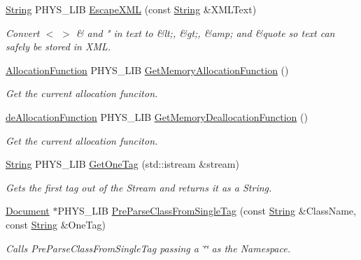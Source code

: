 \begin{DoxyCompactItemize}
\hyperlink{namespacephys_1_1xml_a4d8ca7638328d16d303e5a4c849f4704}{String} PHYS\_\-LIB \hyperlink{namespacephys_1_1xml_abdfe44958945865c471158d8c071f727}{EscapeXML} (const \hyperlink{namespacephys_1_1xml_a4d8ca7638328d16d303e5a4c849f4704}{String} \&XMLText)
\begin{DoxyCompactList}\small\item\em Convert $<$ $>$ \& and " in text to \&lt;, \&gt;, \&amp; and \&quote so text can safely be stored in XML. \item\end{DoxyCompactList}\item 
\hyperlink{namespacephys_1_1xml_a6d772c4cf52d017d4d6ad68ddcbd493f}{AllocationFunction} PHYS\_\-LIB \hyperlink{namespacephys_1_1xml_a0537fb34f1fa41afd138deead1455a5b}{GetMemoryAllocationFunction} ()
\begin{DoxyCompactList}\small\item\em Get the current allocation funciton. \item\end{DoxyCompactList}\item 
\hyperlink{namespacephys_1_1xml_af98b1cb6640aa712180aad89a1c776d8}{deAllocationFunction} PHYS\_\-LIB \hyperlink{namespacephys_1_1xml_a1a2ff3e010e4627424a65a2e584e441e}{GetMemoryDeallocationFunction} ()
\begin{DoxyCompactList}\small\item\em Get the current allocation funciton. \item\end{DoxyCompactList}\item 
\hyperlink{namespacephys_1_1xml_a4d8ca7638328d16d303e5a4c849f4704}{String} PHYS\_\-LIB \hyperlink{namespacephys_1_1xml_a2b175958ac1d39cc297c24e3f377739b}{GetOneTag} (std::istream \&stream)
\begin{DoxyCompactList}\small\item\em Gets the first tag out of the Stream and returns it as a String. \item\end{DoxyCompactList}\item 
\hyperlink{classphys_1_1xml_1_1Document}{Document} $\ast$PHYS\_\-LIB \hyperlink{namespacephys_1_1xml_ad6253962e86b5e7c149aef36662d17e1}{PreParseClassFromSingleTag} (const \hyperlink{namespacephys_1_1xml_a4d8ca7638328d16d303e5a4c849f4704}{String} \&ClassName, const \hyperlink{namespacephys_1_1xml_a4d8ca7638328d16d303e5a4c849f4704}{String} \&OneTag)
\begin{DoxyCompactList}\small\item\em Calls PreParseClassFromSingleTag passing a \char`\"{}\char`\"{} as the Namespace. \item\end{DoxyCompactList}\item 

\end{DoxyCompactItemize}
